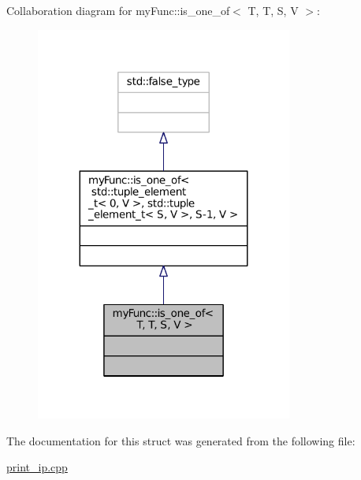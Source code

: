 Collaboration diagram for my\+Func\+:\+:is\+\_\+one\+\_\+of$<$ T, T, S, V $>$\+:
\nopagebreak
\begin{figure}[H]
\begin{center}
\leavevmode
\includegraphics[width=239pt]{structmyFunc_1_1is__one__of_3_01T_00_01T_00_01S_00_01V_01_4__coll__graph}
\end{center}
\end{figure}


The documentation for this struct was generated from the following file\+:\begin{DoxyCompactItemize}
\item 
\hyperlink{print__ip_8cpp}{print\+\_\+ip.\+cpp}\end{DoxyCompactItemize}
